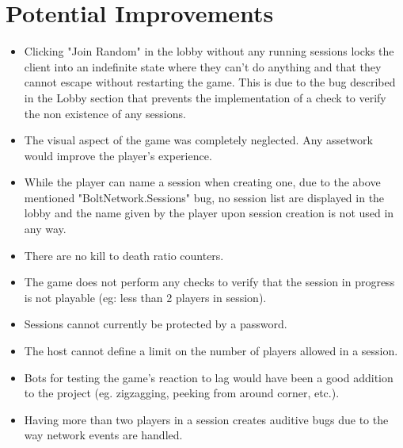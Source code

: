 \documentclass[12pt,a4paper]{article}
\begin{document}
\section{Potential Improvements}
\begin{itemize}
\item Clicking "Join Random" in the lobby without any running sessions locks the client into an indefinite state where they can't do anything and that they cannot escape without restarting the game. This is due to the bug described in the Lobby section that prevents the implementation of a check to verify the non existence of any sessions.
\item The visual aspect of the game was completely neglected. Any assetwork would improve the player's experience.
\item While the player can name a session when creating one, due to the above mentioned "BoltNetwork.Sessions" bug, no session list are displayed in the lobby and the name given by the player upon session creation is not used in any way.
\item There are no kill to death ratio counters.
\item The game does not perform any checks to verify that the session in progress is not playable (eg: less than 2 players in session).
\item Sessions cannot currently be protected by a password.
\item The host cannot define a limit on the number of players allowed in a session.
\item Bots for testing the game's reaction to lag would have been a good addition to the project (eg. zigzagging, peeking from around corner, etc.).
\item Having more than two players in a session creates auditive bugs due to the way network events are handled.
\end{itemize}
\end{document}
